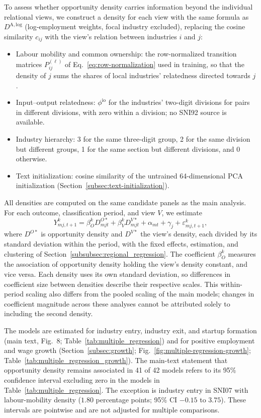 \documentclass[9pt,twoside]{pnas-new}
\begin{document}
To assess whether opportunity density carries information beyond the individual relational views, we construct a density for each view with the same formula as $D^{\mathrm{A,log}}$ (log-employment weights, focal industry excluded), replacing the cosine similarity $c_{ij}$ with the view's relation between industries $i$ and $j$:
\begin{itemize}
\item Labour mobility and common ownership: the row-normalized transition matrices $P^{(\ell)}_{ij}$ of Eq.~\eqref{eq:row-normalization} used in training, so that the density of $j$ sums the shares of local industries' relatedness directed towards $j$.
\item Input--output relatedness: $\phi^{\mathrm{io}}$ for the industries' two-digit divisions for pairs in different divisions, with zero within a division; no SNI92 source is available.
\item Industry hierarchy: 3 for the same three-digit group, 2 for the same division but different groups, 1 for the same section but different divisions, and 0 otherwise.
\item Text initialization: cosine similarity of the untrained 64-dimensional PCA initialization (Section~\ref{subsec:text-initialization}).
\end{itemize}
All densities are computed on the same candidate panels as the main analysis. For each outcome, classification period, and view $V$, we estimate
\begin{equation}
Y^{k}_{mj,t+1}=\beta^{k}_{O}D^{O*}_{mjt}+\beta^{k}_{V}D^{V*}_{mjt}+\alpha_{mt}+\gamma_j+\varepsilon^{k}_{mj,t+1},
\label{eq:si-regional-multiple}
\end{equation}
where $D^{O*}$ is opportunity density and $D^{V*}$ the view's density, each divided by its standard deviation within the period, with the fixed effects, estimation, and clustering of Section~\ref{subsubsec:regional_regression}. The coefficient $\beta^{k}_{O}$ measures the association of opportunity density holding the view's density constant, and vice versa. Each density uses its own standard deviation, so differences in coefficient size between densities describe their respective scales. This within-period scaling also differs from the pooled scaling of the main models; changes in coefficient magnitude across these analyses cannot be attributed solely to including the second density.

The models are estimated for industry entry, industry exit, and startup formation (main text, Fig.~8; Table~\ref{tab:multiple_regression}) and for positive employment and wage growth (Section~\ref{subsec:growth}; Fig.~\ref{fig:multiple-regression-growth}; Table~\ref{tab:multiple_regression_growth}). The main-text statement that opportunity density remains associated in 41 of 42 models refers to its 95\% confidence interval excluding zero in the models in Table~\ref{tab:multiple_regression}. The exception is industry entry in SNI07 with labour-mobility density ($1.80$ percentage points; 95\% CI $-0.15$ to $3.75$). These intervals are pointwise and are not adjusted for multiple comparisons.
\end{document}
